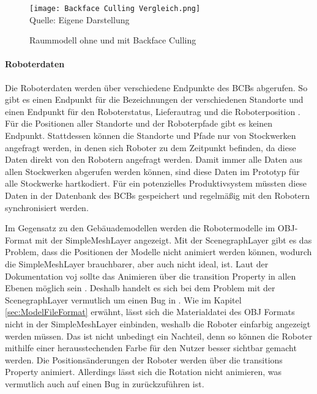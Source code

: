 \begin{figure}[H]\label{fig:BackfaceCulling}
    \caption{Raummodell ohne und mit Backface Culling}
    \texttt{[image: Backface Culling Vergleich.png]}
    \\
    Quelle: Eigene Darstellung
\end{figure}

\paragraph{Roboterdaten}\label{sec:RobotData}
Die Roboterdaten werden über verschiedene Endpunkte des \ac{BCB}s abgerufen. So gibt es einen Endpunkt für die Bezeichnungen der verschiedenen Standorte und einen Endpunkt für den Roboterstatus, Lieferautrag und die Roboterposition \cite{BCBSwagger}. Für die Positionen aller Standorte und der Roboterpfade gibt es keinen Endpunkt. Stattdessen können die Standorte und Pfade nur von Stockwerken angefragt werden, in denen sich Roboter zu dem Zeitpunkt befinden, da diese Daten direkt von den Robotern angefragt werden. Damit immer alle Daten aus allen Stockwerken abgerufen werden können, sind diese Daten im Prototyp für alle Stockwerke hartkodiert. Für ein potenzielles Produktivsystem müssten diese Daten in der Datenbank des \ac{BCB}s gespeichert und regelmäßig mit den Robotern synchronisiert werden.

Im Gegensatz zu den Gebäuademodellen werden die Robotermodelle im \ac{OBJ}-Format mit der SimpleMeshLayer \cite{DeckglSimpleMeshLayer} angezeigt. Mit der ScenegraphLayer gibt es das Problem, dass die Positionen der Modelle nicht animiert werden können, wodurch die SimpleMeshLayer brauchbarer, aber auch nicht ideal, ist. Laut der Dokumentation voj \deckgl{} sollte das Animieren über die transition Property in allen Ebenen möglich sein \cite{DeckglLayerClass}. Deshalb handelt es sich bei dem Problem mit der ScenegraphLayer vermutlich um einen Bug in \deckgl{}. Wie im Kapitel \ref{sec:ModelFileFormat} erwähnt, lässt sich die Materialdatei des \ac{OBJ} Formats nicht in der SimpleMeshLayer einbinden, weshalb die Roboter einfarbig angezeigt werden müssen. Das ist nicht unbedingt ein Nachteil, denn so können die Roboter mithilfe einer herausstechenden Farbe für den Nutzer besser sichtbar gemacht werden. Die Positionsänderungen der Roboter werden über die transitions Property animiert. Allerdings lässt sich die Rotation nicht animieren, was vermutlich auch auf einen Bug in \deckgl{} zurückzuführen ist.

